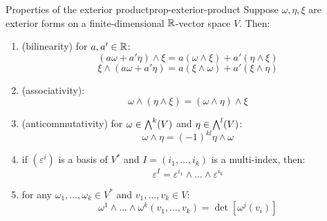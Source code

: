 \begin{lemma}{Properties of the exterior product}{prop-exterior-product}
  Suppose $ \omega , \eta , \xi $ are exterior forms on a finite-dimensional $ \mathbb{R} $-vector space $ V $. Then:
  \begin{enumerate}
    \item \label{item:pwp-1} (bilinearity) for $ a , a' \in \mathbb{R} $:
      \begin{equation*}
        (a \omega + a' \eta ) \wedge \xi = a (\omega \wedge \xi) + a' (\eta \wedge \xi)
      \end{equation*}
      \begin{equation*}
        \xi \wedge (a \omega + a' \eta) = a (\xi \wedge \omega) + a' (\xi \wedge \eta)
      \end{equation*}
    \item \label{item:pwp-2} (associativity):
      \begin{equation*}
        \omega \wedge (\eta \wedge \xi) = (\omega \wedge \eta) \wedge \xi
      \end{equation*}
    \item \label{item:pwp-3} (anticommutativity) for $ \omega \in {\bigwedge}^{k}(V) $ and $ \eta \in {\bigwedge}^{l}(V) $:
      \begin{equation}
        \omega \wedge \eta = (-1)^{kl} \eta \wedge \omega
        \label{eq:form-skew-symmetry}
      \end{equation}
    \item \label{item:pwp-4} if $ (\varepsilon^i) $ is a basis of $ V^* $ and $ I = (i_1 , \dots , i_k) $ is a multi-index, then:
      \begin{equation}
        \varepsilon^I = \varepsilon^{i_1} \wedge \dots \wedge \varepsilon^{i_k}
      \end{equation}
    \item \label{item:pwp-5} for any $ \omega_1 , \dots , \omega_k \in V^* $ and $ v_1 , \dots , v_k \in V $:
      \begin{equation}
        \omega^1 \wedge \dots \wedge \omega^k (v_1 , \dots , v_k) = \det [\omega^j(v_i)]
      \end{equation}
  \end{enumerate}
\end{lemma}

